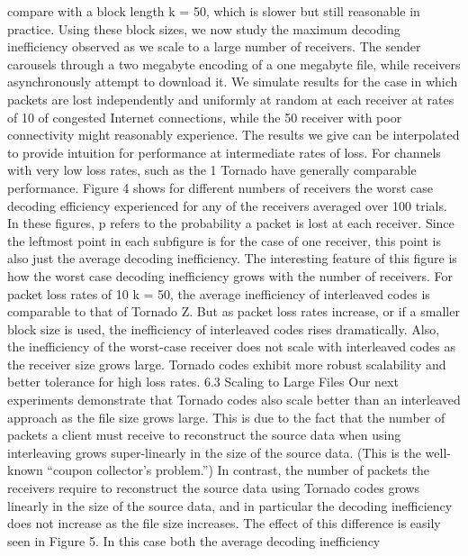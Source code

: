 \documentclass[12pt,a4paper,titlepage,twocolumn]{article}
\begin{document}
compare with a block length k = 50, which is slower
but still reasonable in practice.
Using these block sizes, we now study the maximum
decoding inefficiency observed as we scale to a large
number of receivers. The sender carousels through a
two megabyte encoding of a one megabyte file, while
receivers asynchronously attempt to download it. We
simulate results for the case in which packets are lost independently
and uniformly at random at each receiver
at rates of 10%
of congested Internet connections, while the
50%
receiver with poor connectivity might reasonably
experience. The results we give can be interpolated to
provide intuition for performance at intermediate rates
of loss. For channels with very low loss rates, such as
the 1%
Tornado have generally comparable performance.
Figure 4 shows for different numbers of receivers the
worst case decoding efficiency experienced for any of
the receivers averaged over 100 trials. In these figures,
p refers to the probability a packet is lost at each receiver.
Since the leftmost point in each subfigure is for
the case of one receiver, this point is also just the average
decoding inefficiency. The interesting feature of
this figure is how the worst case decoding inefficiency
grows with the number of receivers.
For packet loss rates of 10%
k = 50, the average inefficiency of interleaved codes
is comparable to that of Tornado Z. But as packet loss
rates increase, or if a smaller block size is used, the inefficiency
of interleaved codes rises dramatically. Also,
the inefficiency of the worst-case receiver does not scale
with interleaved codes as the receiver size grows large.
Tornado codes exhibit more robust scalability and better
tolerance for high loss rates.
6.3 Scaling to Large Files
Our next experiments demonstrate that Tornado codes
also scale better than an interleaved approach as the file
size grows large. This is due to the fact that the number
of packets a client must receive to reconstruct the source
data when using interleaving grows super-linearly in the
size of the source data. (This is the well-known “coupon
collector’s problem.”) In contrast, the number of packets
the receivers require to reconstruct the source data
using Tornado codes grows linearly in the size of the
source data, and in particular the decoding inefficiency
does not increase as the file size increases.
The effect of this difference is easily seen in Figure
5. In this case both the average decoding inefficiency
\end{document}

